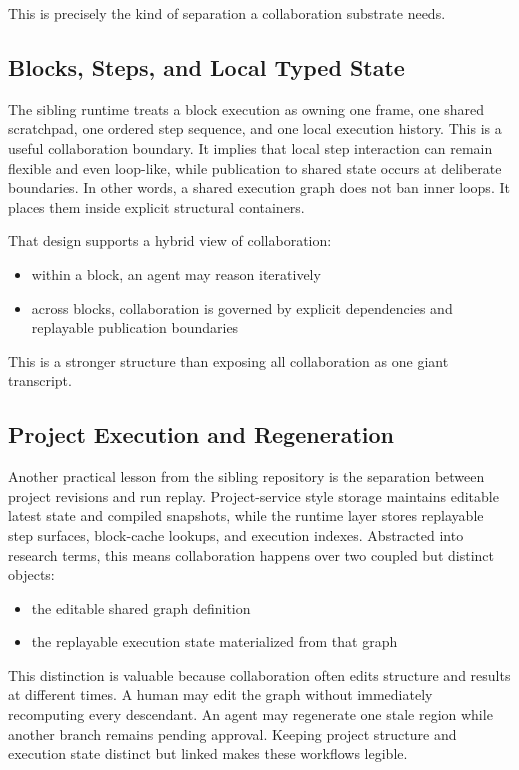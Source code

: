 \documentclass{article}
\begin{document}
This is precisely the kind of separation a collaboration substrate needs.

\subsection{Blocks, Steps, and Local Typed State}

The sibling runtime treats a block execution as owning one frame, one shared scratchpad, one ordered step sequence, and one local execution history. This is a useful collaboration boundary. It implies that local step interaction can remain flexible and even loop-like, while publication to shared state occurs at deliberate boundaries. In other words, a shared execution graph does not ban inner loops. It places them inside explicit structural containers.

That design supports a hybrid view of collaboration:
\begin{itemize}
\item within a block, an agent may reason iteratively
\item across blocks, collaboration is governed by explicit dependencies and replayable publication boundaries
\end{itemize}

This is a stronger structure than exposing all collaboration as one giant transcript.

\subsection{Project Execution and Regeneration}

Another practical lesson from the sibling repository is the separation between project revisions and run replay. Project-service style storage maintains editable latest state and compiled snapshots, while the runtime layer stores replayable step surfaces, block-cache lookups, and execution indexes. Abstracted into research terms, this means collaboration happens over two coupled but distinct objects:
\begin{itemize}
\item the editable shared graph definition
\item the replayable execution state materialized from that graph
\end{itemize}

This distinction is valuable because collaboration often edits structure and results at different times. A human may edit the graph without immediately recomputing every descendant. An agent may regenerate one stale region while another branch remains pending approval. Keeping project structure and execution state distinct but linked makes these workflows legible.
\end{document}
